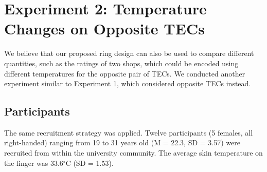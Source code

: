 \documentclass[preprint,12pt]{elsarticle}
\begin{document}




\section{Experiment 2: Temperature Changes on Opposite TECs}
We believe that our proposed ring design can also be used to compare different quantities, such as the ratings of two shops, which could be encoded using different temperatures for the opposite pair of TECs. We conducted another experiment similar to Experiment 1, which considered opposite TECs instead.

\subsection{Participants}
The same recruitment strategy was applied. Twelve participants (5 females, all right-handed) ranging from 19 to 31 years old (M = 22.3, SD = 3.57) were recruited from within the university community. The average skin temperature on the finger was 33.6$^{\circ}$C (SD = 1.53).
\end{document}
